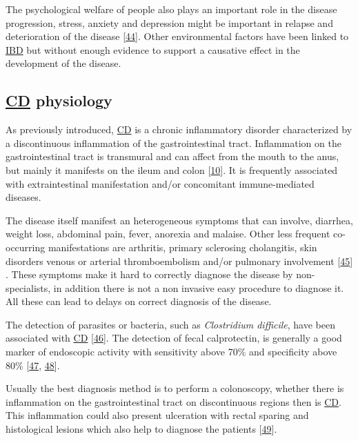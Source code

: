 \documentclass[
  12pt,
  a4paper,
  twoside,
  openright]{book}
\begin{document}
The psychological welfare of people also plays an important role in the disease progression, stress, anxiety and depression might be important in relapse and deterioration of the disease {[}\protect\hyperlink{ref-bitton2008}{44}{]}.
Other environmental factors have been linked to \protect\hyperlink{acronyms_IBD}{IBD} but without enough evidence to support a causative effect in the development of the disease.

\hypertarget{CD}{%
\subsection{\texorpdfstring{\protect\hyperlink{acronyms_CD}{CD} physiology}{CD physiology}}\label{CD}}

As previously introduced, \protect\hyperlink{acronyms_CD}{CD} is a chronic inflammatory disorder characterized by a discontinuous inflammation of the gastrointestinal tract.
Inflammation on the gastrointestinal tract is transmural and can affect from the mouth to the anus, but mainly it manifests on the ileum and colon {[}\protect\hyperlink{ref-demattos2015}{10}{]}.
It is frequently associated with extraintestinal manifestation and/or concomitant immune-mediated diseases.

The disease itself manifest an heterogeneous symptoms that can involve, diarrhea, weight loss, abdominal pain, fever, anorexia and malaise.
Other less frequent co-occurring manifestations are arthritis, primary sclerosing cholangitis, skin disorders venous or arterial thromboembolism and/or pulmonary involvement {[}\protect\hyperlink{ref-baumgart2012}{45}{]} .
These symptoms make it hard to correctly diagnose the disease by non-specialists, in addition there is not a non invasive easy procedure to diagnose it.
All these can lead to delays on correct diagnosis of the disease.

The detection of parasites or bacteria, such as \emph{Clostridium difficile}, have been associated with \protect\hyperlink{acronyms_CD}{CD} {[}\protect\hyperlink{ref-khanna2017}{46}{]}.
The detection of fecal calprotectin, is generally a good marker of endoscopic activity with sensitivity above 70\% and specificity above 80\% {[}\protect\hyperlink{ref-guardiola2018}{47}, \protect\hyperlink{ref-sands2015}{48}{]}.

Usually the best diagnosis method is to perform a colonoscopy, whether there is inflammation on the gastrointestinal tract on discontinuous regions then is \protect\hyperlink{acronyms_CD}{CD}.
This inflammation could also present ulceration with rectal sparing and histological lesions which also help to diagnose the patients {[}\protect\hyperlink{ref-corralizamuxe1rquez2019}{49}{]}.
\end{document}
